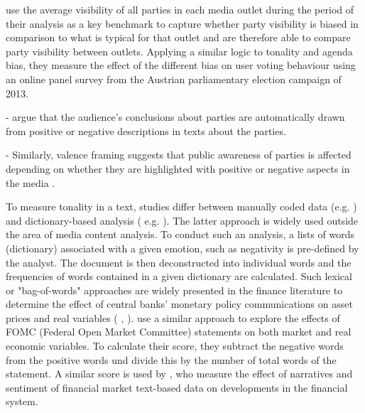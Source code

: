 \documentclass[12pt,a4paper,notitlepage]{article}
\begin{document}
\citet{eberl_one_2017} use the average visibility of all parties in each media outlet during the period of their analysis as a key benchmark to capture whether party visibility is biased in comparison to what is typical for that outlet and are therefore able to compare party visibility between outlets. Applying a similar logic to tonality and agenda bias, they measure the effect of the different bias on user voting behaviour using an online panel survey from the Austrian parliamentary election campaign of 2013. 



- \citet{druckman_impact_2005} argue that the audience's conclusions about parties are automatically drawn from positive or negative descriptions in texts about the parties. 

- Similarly, valence framing suggests that public awareness of parties is affected depending on whether they are highlighted with positive or negative aspects in the media \citep{de_vreese_valenced_2006, hurtikova_importance_2017}.  

To measure tonality in a text, studies differ between manually coded data (e.g. \citet{eberl_one_2017}) and dictionary-based analysis ( e.g. \citep{junque_de_fortuny_media_2012}). The latter approach is widely used outside the area of media content analysis. To conduct such an analysis, a lists of words (dictionary) associated with a given emotion, such as negativity is pre-defined by the analyst. The document is then deconstructed into individual words and the frequencies of words contained in a given dictionary are calculated. Such lexical or "bag-of-words" approaches are widely presented in the finance literature to determine the effect of central banks' monetary policy communications on asset prices and real variables (\citet{nyman_news_2018} \citet{tetlock_giving_2007}, \citet{tetlock_more_2008}). \citet{hansen_shocking_2016} use a similar approach to explore the effects of FOMC (Federal Open Market Committee) statements on both market and real economic variables. To calculate their score, they subtract the negative words from the positive words und divide this by the number of total words of the statement. A similar score is used by \citet{nyman_news_2018}, who measure the effect of narratives and sentiment of financial market text-based data on developments in the financial system. 
\end{document}

